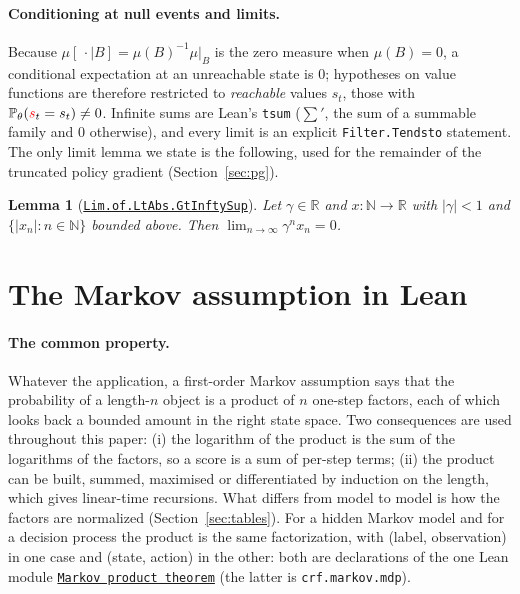 \documentclass[11pt,a4paper]{article}
\newcommand{\lmod}[2]{\href{http://www.lemma.cn/lean/?module=#2}{\nolinkurl{#1}}}
\newtheorem{lemma}[theorem]{Lemma}
\newcommand{\R}{\mathbb{R}}
\newcommand{\N}{\mathbb{N}}
\newcommand{\Prb}{\mathbb{P}}
\newcommand{\rv}[1]{{\color{red}#1}}       %
\newcommand{\sv}{\rv{s}}
\newcommand{\tsum}{\textstyle\sum'}
\begin{document}
\paragraph{Conditioning at null events and limits.}
Because $\mu[\,\cdot\mid B]=\mu(B)^{-1}\mu|_B$ is the zero measure when $\mu(B)=0$, a conditional expectation at an unreachable state is $0$; hypotheses on value functions are therefore restricted to \emph{reachable} values $s_t$, those with $\Prb_\theta(\sv_t=s_t)\ne0$.
Infinite sums are Lean's \texttt{tsum} ($\tsum$, the sum of a summable family and $0$ otherwise), and every limit is an explicit \texttt{Filter.Tendsto} statement.
The only limit lemma we state is the following, used for the remainder of the truncated policy gradient (Section~\ref{sec:pg}).

\begin{lemma}[\lmod{Lim.of.LtAbs.GtInftySup}{Real.Eq_0.Lim.of.LtAbs.GtInftySup}]
\label{lem:lim}
Let $\gamma\in\R$ and $x:\N\to\R$ with $|\gamma|<1$ and $\{|x_n|:n\in\N\}$ bounded above.
Then $\displaystyle\lim_{n\to\infty}\gamma^n x_n=0$.
\end{lemma}

\section{The Markov assumption in Lean}
\label{sec:markov}

\paragraph{The common property.}
Whatever the application, a first-order Markov assumption says that the probability of a length-$n$ object is a product of $n$ one-step factors, each of which looks back a bounded amount in the right state space.
Two consequences are used throughout this paper: (i) the logarithm of the product is the sum of the logarithms of the factors, so a score is a sum of per-step terms; (ii) the product can be built, summed, maximised or differentiated by induction on the length, which gives linear-time recursions.
What differs from model to model is how the factors are normalized (Section~\ref{sec:tables}).
For a hidden Markov model and for a decision process the product is the same factorization, with (label, observation) in one case and (state, action) in the other: both are declarations of the one Lean module \lmod{Markov product theorem}{Random.ProbJoint.eq.Mul_Prod_MulProbSCond.of.IsDiscreteHMM} (the latter is \texttt{crf.markov.mdp}).
\end{document}
